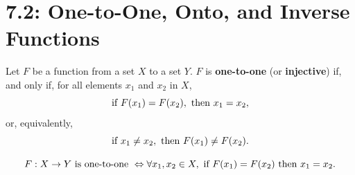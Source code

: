 \documentclass[../mathNotesPreamble]{subfiles}
\providecommand{\relscalefact}{1.4}
\begin{document}
\relscale{\relscalefact}
  \section{7.2: One-to-One, Onto, and Inverse Functions}
  \begin{defn*}
    Let $F$ be a function from a set $X$ to a set $Y$. $F$ is \textbf{one-to-one} (or \textbf{injective}) if, and only if, for all elements $x_1$ and $x_2$ in $X$,
      \[\textnormal{if } F(x_1)=F(x_2), \textnormal{ then } x_1=x_2,\]
    or, equivalently,
      \[\textnormal{if } x_1\neq x_2, \textnormal{ then } F(x_1)\neq F(x_2).\]

      \[F:X \to Y \textnormal{ is one-to-one } \Leftrightarrow \forall x_1, x_2 \in X, \textnormal{ if } F(x_1)=F(x_2) \textnormal{ then } x_1=x_2.\]
  \end{defn*}
\end{document}
